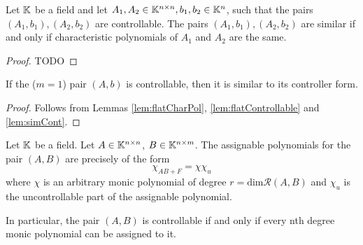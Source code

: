 \begin{lemma}
\label{lem:simCont}
    Let $\mathbb{K}$ be a field and let $A_1,A_2\in\mathbb{K}^{n\times n},b_1,b_2\in\mathbb{K}^n$, such that the pairs $(A_1,b_1),(A_2,b_2)$ are controllable. The pairs $(A_1,b_1),(A_2,b_2)$ are similar if and only if characteristic polynomials of $A_1$ and $A_2$ are the same.
\end{lemma}

\begin{proof}
    TODO
\end{proof}

\begin{cor}
    If the  ($m=1$) pair $(A,b)$ is controllable, then it is similar to its controller form.
\end{cor}

\begin{proof}
    Follows from Lemmas \ref{lem:flatCharPol}, \ref{lem:flatControllable} and \ref{lem:simCont}. 
\end{proof}

\begin{theorem}
    Let $\mathbb{K}$ be a field. Let $A\in\mathbb{K}^{n\times n}$, $B\in\mathbb{K}^{n\times m}$. The assignable polynomials for the pair $(A,B)$ are precisely of the form $$\chi_{AB+F}=\chi\chi_u$$ where $\chi$ is an arbitrary monic polynomial of degree $r=\text{dim}\mathcal{R}(A,B)$ and $\chi_u$ is the uncontrollable part of the assignable polynomial.

    In particular, the pair $(A,B)$ is controllable if and only if every nth degree monic polynomial can be assigned to it.
\end{theorem}


